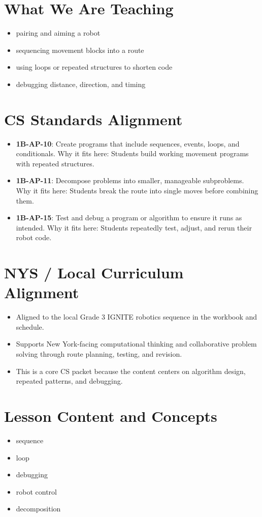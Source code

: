\documentclass[11pt]{article}
\begin{document}
\section*{What We Are Teaching}
\begin{itemize}[leftmargin=*]
\item pairing and aiming a robot
\item sequencing movement blocks into a route
\item using loops or repeated structures to shorten code
\item debugging distance, direction, and timing
\end{itemize}

\section*{CS Standards Alignment}
\begin{itemize}[leftmargin=*]
\item \textbf{1B-AP-10}: Create programs that include sequences, events, loops, and conditionals. Why it fits here: Students build working movement programs with repeated structures.
\item \textbf{1B-AP-11}: Decompose problems into smaller, manageable subproblems. Why it fits here: Students break the route into single moves before combining them.
\item \textbf{1B-AP-15}: Test and debug a program or algorithm to ensure it runs as intended. Why it fits here: Students repeatedly test, adjust, and rerun their robot code.
\end{itemize}

\section*{NYS / Local Curriculum Alignment}
\begin{itemize}[leftmargin=*]
\item Aligned to the local Grade 3 IGNITE robotics sequence in the workbook and schedule.
\item Supports New York-facing computational thinking and collaborative problem solving through route planning, testing, and revision.
\item This is a core CS packet because the content centers on algorithm design, repeated patterns, and debugging.
\end{itemize}

\section*{Lesson Content and Concepts}
\begin{itemize}[leftmargin=*]
\item sequence
\item loop
\item debugging
\item robot control
\item decomposition
\end{itemize}
\end{document}
